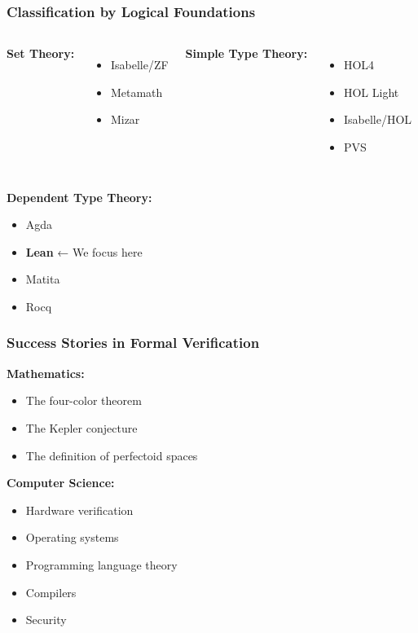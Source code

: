 \documentclass{beamer}
\begin{document}
\begin{frame}
  \frametitle{Classification by Logical Foundations}
  
  \begin{columns}
    \textbf{Set Theory:}
    \begin{itemize}
      \item Isabelle/ZF
      \item Metamath
      \item Mizar
    \end{itemize}
    
    \textbf{Simple Type Theory:}
    \begin{itemize}
      \item HOL4
      \item HOL Light
      \item Isabelle/HOL
      \item PVS
    \end{itemize}
  \end{columns}
  
  \vspace{0.5cm}
  
  \textbf{Dependent Type Theory:}
  \begin{itemize}
    \item Agda
    \item \textbf{Lean} ← We focus here
    \item Matita
    \item Rocq
  \end{itemize}
\end{frame}

\begin{frame}
  \frametitle{Success Stories in Formal Verification}
  
  \textbf{Mathematics:}
  \begin{itemize}
    \item The four-color theorem
    \item The Kepler conjecture
    \item The definition of perfectoid spaces
  \end{itemize}
  
  \vspace{0.3cm}
  
  \textbf{Computer Science:}
  \begin{itemize}
    \item Hardware verification
    \item Operating systems
    \item Programming language theory
    \item Compilers
    \item Security
  \end{itemize}
\end{frame}
\end{document}
